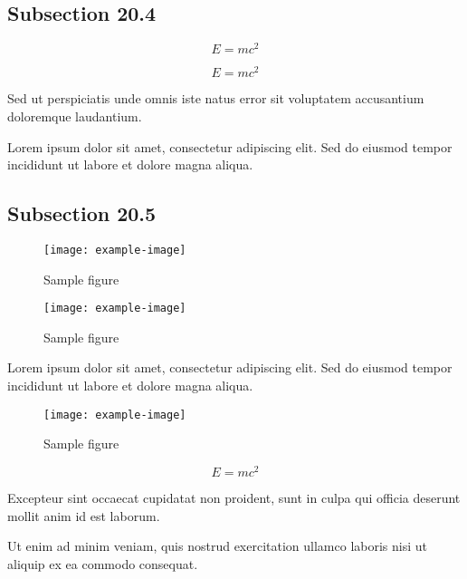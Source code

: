 \documentclass{article}
\begin{document}
\subsection{Subsection 20.4}

\begin{equation}
    E = mc^2
\end{equation}

\begin{equation}
    E = mc^2
\end{equation}

Sed ut perspiciatis unde omnis iste natus error sit voluptatem accusantium doloremque laudantium.

Lorem ipsum dolor sit amet, consectetur adipiscing elit. Sed do eiusmod tempor incididunt ut labore et dolore magna aliqua.

\subsection{Subsection 20.5}

\begin{figure}[h]
    \centering
    \texttt{[image: example-image]}
    \caption{Sample figure}
    \label{fig:sample}
\end{figure}

\begin{figure}[h]
    \centering
    \texttt{[image: example-image]}
    \caption{Sample figure}
    \label{fig:sample}
\end{figure}


Lorem ipsum dolor sit amet, consectetur adipiscing elit. Sed do eiusmod tempor incididunt ut labore et dolore magna aliqua.

\begin{figure}[h]
    \centering
    \texttt{[image: example-image]}
    \caption{Sample figure}
    \label{fig:sample}
\end{figure}

\begin{equation}
    E = mc^2
\end{equation}

Excepteur sint occaecat cupidatat non proident, sunt in culpa qui officia deserunt mollit anim id est laborum.

Ut enim ad minim veniam, quis nostrud exercitation ullamco laboris nisi ut aliquip ex ea commodo consequat.
\end{document}
